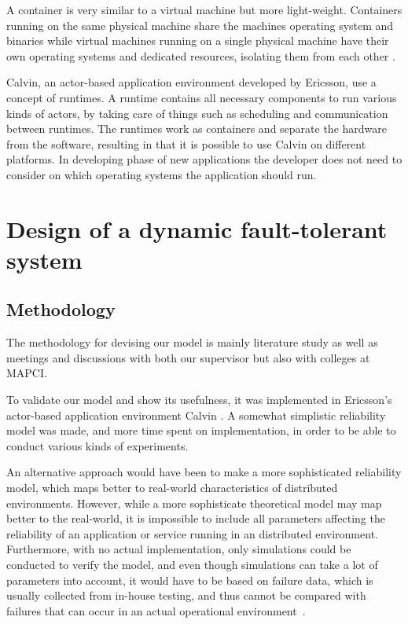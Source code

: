 \documentclass{cslthse-msc}
\begin{document}
A container is very similar to a virtual machine but more light-weight. Containers running on the same physical machine share the machines operating system and binaries while virtual machines running on a single physical machine have their own operating systems and dedicated resources, isolating them from each other \cite{vm_vs_container}.

Calvin, an actor-based application environment developed by Ericsson, use a concept of runtimes. A runtime contains all necessary components to run various kinds of actors, by taking care of things such as scheduling and communication between runtimes. The runtimes work as containers and separate the hardware from the software, resulting in that it is possible to use Calvin on different platforms. In developing phase of new applications the developer does not need to consider on which operating systems the application should run.

\chapter{Design of a dynamic fault-tolerant system} \label{ch:design}
\section{Methodology} \label{sec:design_methodology}
The methodology for devising our model is mainly literature study as well as meetings and discussions with both our supervisor but also with colleges at MAPCI.

To validate our model and show its usefulness, it was implemented in Ericsson's actor-based application environment Calvin \cite{calvin}. A somewhat simplistic reliability model was made, and more time spent on implementation, in order to be able to conduct various kinds of experiments. 

An alternative approach would have been to make a more sophisticated reliability model, which maps better to real-world characteristics of distributed environments. However, while a more sophisticate theoretical model may map better to the real-world, it is impossible to include all parameters affecting the reliability of an application or service running in an distributed environment. Furthermore, with no actual implementation, only simulations could be conducted to verify the model, and even though simulations can take a lot of parameters into account, it would have to be based on failure data, which is usually collected from in-house testing, and thus cannot be compared with failures that can occur in an actual operational environment~\cite{surveyReliabilityDistr}.
\end{document}
